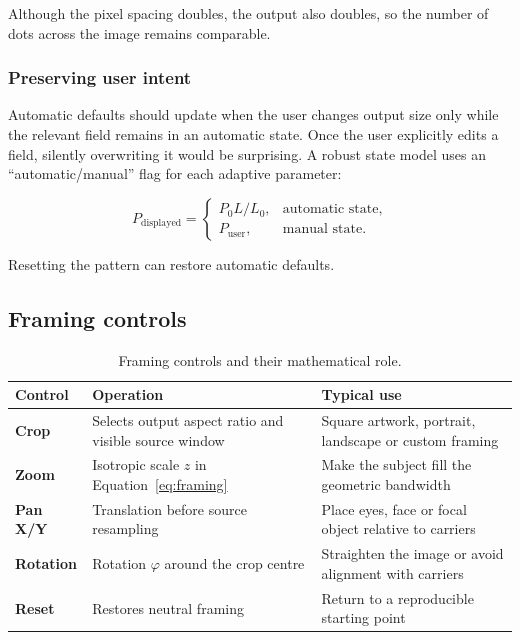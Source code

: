 Although the pixel spacing doubles, the output also doubles, so the number of dots across the image remains comparable.

\subsubsection{Preserving user intent}

Automatic defaults should update when the user changes output size only while the relevant field remains in an automatic state. Once the user explicitly edits a field, silently overwriting it would be surprising. A robust state model uses an ``automatic/manual'' flag for each adaptive parameter:

\begin{equation}
P_{\mathrm{displayed}}=
\begin{cases}
P_0L/L_0,&\text{automatic state},\\
P_{\mathrm{user}},&\text{manual state}.
\end{cases}
\label{eq:auto-manual}
\end{equation}

Resetting the pattern can restore automatic defaults.

\subsection{Framing controls}

\begin{table}[H]
\centering
\caption{Framing controls and their mathematical role.}
\begin{tabularx}{\textwidth}{>{\bfseries}l >{\raggedright\arraybackslash}X >{\raggedright\arraybackslash}X}
\toprule
Control & Operation & Typical use \\
\midrule
Crop & Selects output aspect ratio and visible source window & Square artwork, portrait, landscape or custom framing \\
Zoom & Isotropic scale $z$ in Equation~\eqref{eq:framing} & Make the subject fill the geometric bandwidth \\
Pan X/Y & Translation before source resampling & Place eyes, face or focal object relative to carriers \\
Rotation & Rotation $\varphi$ around the crop centre & Straighten the image or avoid alignment with carriers \\
Reset & Restores neutral framing & Return to a reproducible starting point \\
\bottomrule
\end{tabularx}
\end{table}

